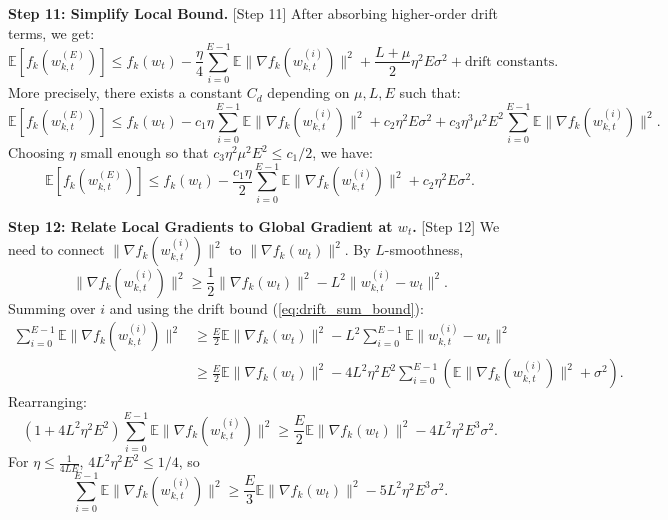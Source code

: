 \documentclass{article}
\begin{document}
\textbf{Step 11: Simplify Local Bound.} [Step 11]
After absorbing higher-order drift terms, we get:
\begin{equation}
    \mathbb{E}[f_k(w_{k,t}^{(E)})] \leq f_k(w_t) - \frac{\eta}{4} \sum_{i=0}^{E-1} \mathbb{E} \| \nabla f_k(w_{k,t}^{(i)}) \|^2 + \frac{L+\mu}{2} \eta^2 E \sigma^2 + \text{drift constants}. \label{eq:local_final}
\end{equation}
More precisely, there exists a constant $C_d$ depending on $\mu, L, E$ such that:
\begin{equation}
    \mathbb{E}[f_k(w_{k,t}^{(E)})] \leq f_k(w_t) - c_1 \eta \sum_{i=0}^{E-1} \mathbb{E} \| \nabla f_k(w_{k,t}^{(i)}) \|^2 + c_2 \eta^2 E \sigma^2 + c_3 \eta^3 \mu^2 E^2 \sum_{i=0}^{E-1} \mathbb{E} \| \nabla f_k(w_{k,t}^{(i)}) \|^2.
\end{equation}
Choosing $\eta$ small enough so that $c_3 \eta^2 \mu^2 E^2 \leq c_1/2$, we have:
\begin{equation}
    \mathbb{E}[f_k(w_{k,t}^{(E)})] \leq f_k(w_t) - \frac{c_1 \eta}{2} \sum_{i=0}^{E-1} \mathbb{E} \| \nabla f_k(w_{k,t}^{(i)}) \|^2 + c_2 \eta^2 E \sigma^2. \label{eq:local_clean}
\end{equation}

\textbf{Step 12: Relate Local Gradients to Global Gradient at $w_t$.} [Step 12]
We need to connect $\| \nabla f_k(w_{k,t}^{(i)}) \|^2$ to $\| \nabla f_k(w_t) \|^2$. By $L$-smoothness,
\begin{equation}
    \| \nabla f_k(w_{k,t}^{(i)}) \|^2 \geq \frac{1}{2} \| \nabla f_k(w_t) \|^2 - L^2 \| w_{k,t}^{(i)} - w_t \|^2.
\end{equation}
Summing over $i$ and using the drift bound (\ref{eq:drift_sum_bound}):
\begin{align}
    \sum_{i=0}^{E-1} \mathbb{E} \| \nabla f_k(w_{k,t}^{(i)}) \|^2 &\geq \frac{E}{2} \mathbb{E} \| \nabla f_k(w_t) \|^2 - L^2 \sum_{i=0}^{E-1} \mathbb{E} \| w_{k,t}^{(i)} - w_t \|^2 \\
    &\geq \frac{E}{2} \mathbb{E} \| \nabla f_k(w_t) \|^2 - 4 L^2 \eta^2 E^2 \sum_{i=0}^{E-1} \left( \mathbb{E} \| \nabla f_k(w_{k,t}^{(i)}) \|^2 + \sigma^2 \right).
\end{align}
Rearranging:
\begin{equation}
    \left(1 + 4 L^2 \eta^2 E^2\right) \sum_{i=0}^{E-1} \mathbb{E} \| \nabla f_k(w_{k,t}^{(i)}) \|^2 \geq \frac{E}{2} \mathbb{E} \| \nabla f_k(w_t) \|^2 - 4 L^2 \eta^2 E^3 \sigma^2.
\end{equation}
For $\eta \leq \frac{1}{4 L E}$, $4 L^2 \eta^2 E^2 \leq 1/4$, so
\begin{equation}
    \sum_{i=0}^{E-1} \mathbb{E} \| \nabla f_k(w_{k,t}^{(i)}) \|^2 \geq \frac{E}{3} \mathbb{E} \| \nabla f_k(w_t) \|^2 - 5 L^2 \eta^2 E^3 \sigma^2. \label{eq:grad_relate}
\end{equation}
\end{document}
